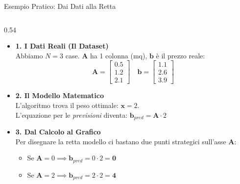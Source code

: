 \documentclass[aspectratio=169, 10pt]{beamer}
\begin{document}
\begin{frame}{Esempio Pratico: Dai Dati alla Retta}
    \begin{columns}[T,onlytextwidth]
        \setlength{\columnsep}{0.2cm}
        
        \begin{column}{0.54\textwidth} %
            \vspace{0.1cm}
            \small
            \begin{itemize}
                \setlength\itemsep{0.6em} %
                
                \item \textbf{1. I Dati Reali (Il Dataset)}\\
                Abbiamo $N=3$ case. $\mathbf{A}$ ha 1 colonna (mq), $\mathbf{b}$ è il prezzo reale:
                \vspace{-0.15cm} %
                \[
                \mathbf{A} = \begin{bmatrix} 0.5 \\ 1.2 \\ 2.1 \end{bmatrix} \quad 
                \mathbf{b} = \begin{bmatrix} 1.1 \\ 2.6 \\ 3.9 \end{bmatrix}
                \]
                \vspace{-0.15cm} %
                
                \item \textbf{2. Il Modello Matematico}\\
                L'algoritmo trova il peso ottimale: \textbf{$\mathbf{x} = 2$}.\\
                L'equazione per le \textit{previsioni} diventa: \textbf{$\mathbf{b}_{pred} = \mathbf{A} \cdot 2$}
                
                \item \textbf{3. Dal Calcolo al Grafico}\\
                Per disegnare la retta modello ci bastano due punti strategici sull'asse $\mathbf{A}$:
                \begin{itemize}
                    \item Se $\mathbf{A} = 0 \implies \mathbf{b}_{pred} = 0 \cdot 2 = \mathbf{0}$
                    \item Se $\mathbf{A} = 2 \implies \mathbf{b}_{pred} = 2 \cdot 2 = \mathbf{4}$
                \end{itemize}
                

\end{itemize}
\end{column}
\end{columns}
\end{frame}
\end{document}
